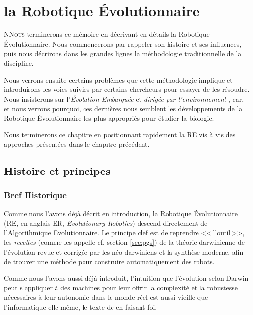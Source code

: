 
\chapter{la Robotique Évolutionnaire}\label{ch:RE}

\lettrine[lines=2]{N}{Nous} terminerons ce mémoire en décrivant en détails la Robotique \'Evolutionnaire. Nous commencerons par rappeler son histoire et ses influences, puis nous décrirons dans les grandes lignes la méthodologie traditionnelle de la discipline.

Nous verrons ensuite certains problèmes que cette méthodologie implique et introduirons les voies suivies par certains chercheurs pour essayer de les résoudre. Nous insisterons sur l'\emph{\'Evolution Embarquée} \citep{watson02embodiedevolutiondistributingevolutionaryalgorithmpopulationrobots} et \emph{dirigée par l'environnement} \citep{bredeche2012environmentdrivendistributedevolutionaryadaptation}, car, et nous verrons pourquoi, ces dernières nous semblent les développements de la Robotique \'Evolutionnaire les plus appropriés pour étudier la biologie.

Nous terminerons ce chapitre en positionnant rapidement la RE vis à vis des approches présentées dans le chapitre précédent.



\section{Histoire et principes}\label{sec:re}

\subsection{Bref Historique}

Comme nous l'avons déjà décrit en introduction, la Robotique Évolutionnaire (RE, en anglais ER, \emph{Evolutionary Robotics}) descend directement de l'Algorithmique Évolutionnaire. Le principe clef est de reprendre <<\,l'outil\,>>, les \emph{recettes} (comme les appelle \cite{godfrey2009darwinian} cf. section \ref{sec:pgs}) de la théorie darwinienne de l'évolution revue et corrigée par les néo-darwiniens et la synthèse moderne, afin de trouver une méthode pour construire automatiquement des robots.

Comme nous l'avons aussi déjà introduit, l'intuition que l'évolution selon Darwin peut s'appliquer à des machines pour leur offrir la complexité et la robustesse nécessaires à leur autonomie dans le monde réel est aussi vieille que l'informatique elle-même, le texte de \cite{turing50computingmachineryintelligence} en faisant foi.

